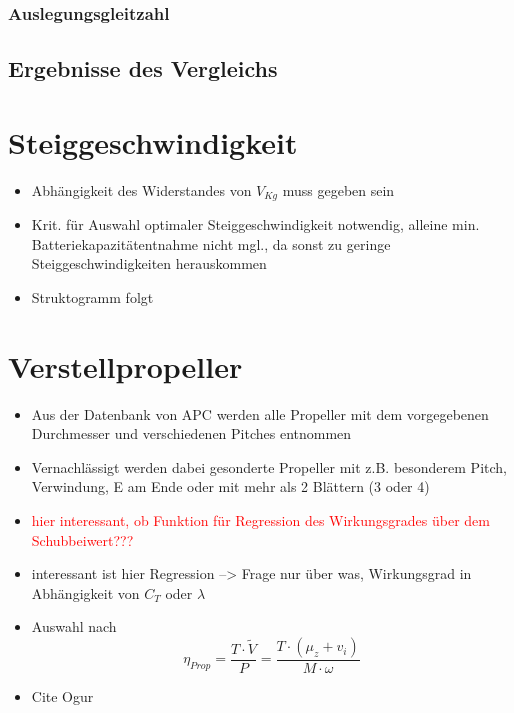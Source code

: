\subsubsection{Auslegungsgleitzahl}

\subsection{Ergebnisse des Vergleichs} 




\section{Steiggeschwindigkeit}
\label{sec:steiggeschwindigkeit}

\begin{itemize}
	\item Abhängigkeit des Widerstandes von \ensuremath{V_{Kg}} muss gegeben sein
	\item Krit. für Auswahl optimaler Steiggeschwindigkeit notwendig, alleine min. Batteriekapazitätentnahme nicht mgl., da sonst zu geringe Steiggeschwindigkeiten herauskommen
	\item Struktogramm folgt
\end{itemize}

\section{Verstellpropeller}
\label{sec:verstellprop}

\begin{itemize}
	\item Aus der Datenbank von APC werden alle Propeller mit dem vorgegebenen Durchmesser und verschiedenen Pitches entnommen
	\item Vernachlässigt werden dabei gesonderte Propeller mit z.B. besonderem Pitch, Verwindung, E am Ende oder mit mehr als 2 Blättern (3 oder 4)
	\item \textcolor{red}{hier interessant, ob Funktion für Regression des Wirkungsgrades über dem Schubbeiwert???}
	\item interessant ist hier Regression --> Frage nur über was, Wirkungsgrad in Abhängigkeit von \ensuremath{C_T} oder \ensuremath{\lambda}
	\item Auswahl nach 
	\begin{equation}
		\eta_{Prop} = \frac{T\cdot\tilde{V}}{P} = \frac{T\cdot (\mu_z + v_i)}{M\cdot \omega}
	\end{equation}
	\item Cite Ogur
\end{itemize}

